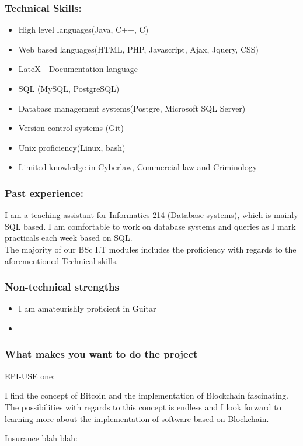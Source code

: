 \documentclass{article}
\begin{document}
	\subsubsection{Technical Skills:}
	\begin{itemize}
		\item High level languages(Java, C++, C)
		\item Web based languages(HTML, PHP, Javascript, Ajax, Jquery, CSS)
		\item LateX - Documentation language
		\item SQL (MySQL, PostgreSQL)
		\item Database management systems(Postgre, Microsoft SQL Server)
		\item Version control systems (Git)
		\item Unix proficiency(Linux, bash)
		\item Limited knowledge in Cyberlaw, Commercial law and Criminology
	\end{itemize}
	\subsubsection{Past experience:}
	I am a teaching assistant for Informatics 214 (Database systems), which is mainly SQL based. I am comfortable to work on database systems and queries as I mark practicals each week based on SQL. \\
	The majority of our BSc I.T modules includes the proficiency with regards to the aforementioned Technical skills.
	\subsubsection{Non-technical strengths}
	\begin{itemize}
		\item I am amateurishly proficient in Guitar
		\item 
	\end{itemize}
	\subsubsection{What makes you want to do the project}
	EPI-USE one:
	
	I find the concept of Bitcoin and the implementation of Blockchain fascinating. The possibilities with regards to this concept is endless and I look forward to learning more about the implementation of software based on Blockchain.
	
	Insurance blah blah:
	
\end{document}
